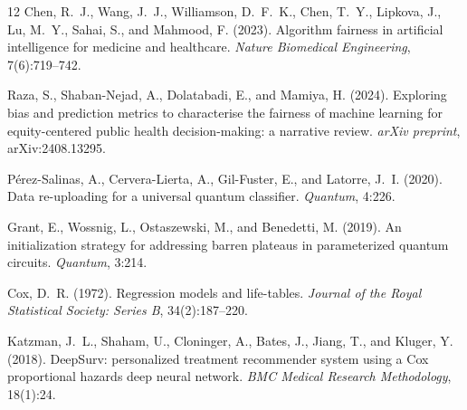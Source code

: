 \documentclass[12pt, letterpaper]{article}
\begin{document}
\begin{thebibliography}{12}
Chen, R.~J., Wang, J.~J., Williamson, D.~F.~K., Chen, T.~Y., Lipkova, J., Lu, M.~Y., Sahai, S., and Mahmood, F. (2023).
\newblock Algorithm fairness in artificial intelligence for medicine and healthcare.
\newblock \textit{Nature Biomedical Engineering}, 7(6):719--742.

Raza, S., Shaban-Nejad, A., Dolatabadi, E., and Mamiya, H. (2024).
\newblock Exploring bias and prediction metrics to characterise the fairness of machine learning for equity-centered public health decision-making: a narrative review.
\newblock \textit{arXiv preprint}, arXiv:2408.13295.

P\'{e}rez-Salinas, A., Cervera-Lierta, A., Gil-Fuster, E., and Latorre, J.~I. (2020).
\newblock Data re-uploading for a universal quantum classifier.
\newblock \textit{Quantum}, 4:226.

Grant, E., Wossnig, L., Ostaszewski, M., and Benedetti, M. (2019).
\newblock An initialization strategy for addressing barren plateaus in parameterized quantum circuits.
\newblock \textit{Quantum}, 3:214.

Cox, D.~R. (1972).
\newblock Regression models and life-tables.
\newblock \textit{Journal of the Royal Statistical Society: Series B}, 34(2):187--220.

Katzman, J.~L., Shaham, U., Cloninger, A., Bates, J., Jiang, T., and Kluger, Y. (2018).
\newblock DeepSurv: personalized treatment recommender system using a Cox proportional hazards deep neural network.
\newblock \textit{BMC Medical Research Methodology}, 18(1):24.

\end{thebibliography}
\end{document}
